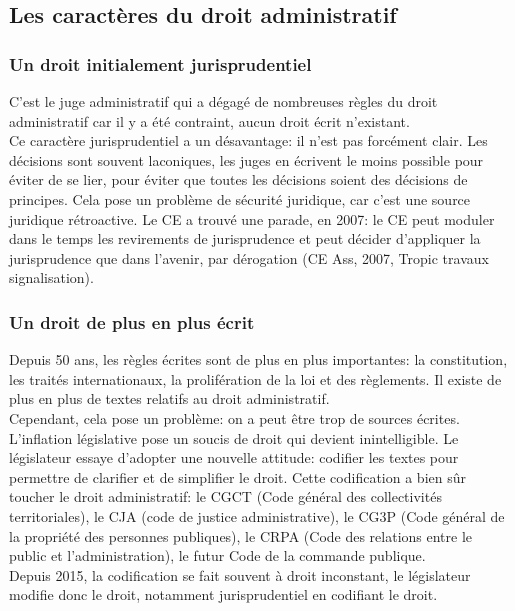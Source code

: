 \documentclass[10pt, a4paper, openany]{book}
\begin{document}
\subsection{Les caractères du droit administratif}

\subsubsection{Un droit initialement jurisprudentiel}

C'est le juge administratif qui a dégagé de nombreuses règles du droit administratif car il y a été contraint, aucun droit écrit n'existant. \\
Ce caractère jurisprudentiel a un désavantage: il n'est pas forcément clair. Les décisions sont souvent laconiques, les juges en écrivent le moins possible pour éviter de se lier, pour éviter que toutes les décisions soient des décisions de principes. Cela pose un problème de sécurité juridique, car c'est une source juridique rétroactive. Le CE a trouvé une parade, en 2007: le CE peut moduler dans le temps les revirements de jurisprudence et peut décider d'appliquer la jurisprudence que dans l'avenir, par dérogation (CE Ass, 2007, Tropic travaux signalisation). 

\subsubsection{Un droit de plus en plus écrit}

Depuis 50 ans, les règles écrites sont de plus en plus importantes: la constitution, les traités internationaux, la prolifération de la loi et des règlements. Il existe de plus en plus de textes relatifs au droit administratif. \\
Cependant, cela pose un problème: on a peut être trop de sources écrites. L'inflation législative pose un soucis de droit qui devient inintelligible. Le législateur essaye d'adopter une nouvelle attitude: codifier les textes pour permettre de clarifier et de simplifier le droit. Cette codification a bien sûr toucher le droit administratif: le CGCT (Code général des collectivités territoriales), le CJA (code de justice administrative), le CG3P (Code général de la propriété des personnes publiques), le CRPA (Code des relations entre le public et l'administration), le futur Code de la commande publique. \\
Depuis 2015, la codification se fait souvent à droit inconstant, le législateur modifie donc le droit, notamment jurisprudentiel en codifiant le droit. 
\end{document}
